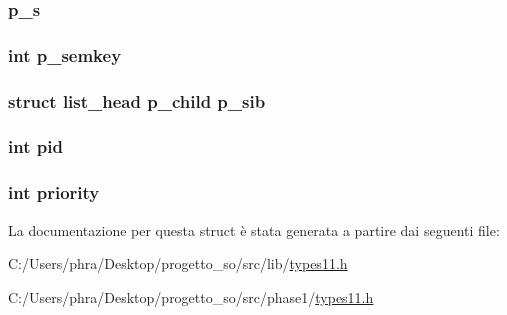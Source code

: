 \hypertarget{structpcb__t_ae1524fbfc37b7766b551477e48b3bf4d}{
\subsubsection[{p\-\_\-s}]{ p\-\_\-s}}\label{structpcb__t_ae1524fbfc37b7766b551477e48b3bf4d}
\hypertarget{structpcb__t_a831f803a73e91f4b1530e60bc24e92b4}{
\subsubsection[{p\-\_\-semkey}]{\setlength{\rightskip}{0pt plus 5cm}int p\-\_\-semkey}}\label{structpcb__t_a831f803a73e91f4b1530e60bc24e92b4}
\hypertarget{structpcb__t_ae571e01892f17d1ccf6332d96e6c5373}{
\subsubsection[{p\-\_\-sib}]{\setlength{\rightskip}{0pt plus 5cm}struct {\bf list\-\_\-head} p\-\_\-child p\-\_\-sib}}\label{structpcb__t_ae571e01892f17d1ccf6332d96e6c5373}
\hypertarget{structpcb__t_af500917c052066b40cf47f96b43c607b}{
\subsubsection[{pid}]{\setlength{\rightskip}{0pt plus 5cm}int pid}}\label{structpcb__t_af500917c052066b40cf47f96b43c607b}
\hypertarget{structpcb__t_acec9ce2df15222151ad66fcb1d74eb9f}{
\subsubsection[{priority}]{\setlength{\rightskip}{0pt plus 5cm}int priority}}\label{structpcb__t_acec9ce2df15222151ad66fcb1d74eb9f}


La documentazione per questa struct è stata generata a partire dai seguenti file\-:\begin{DoxyCompactItemize}
\item 
C\-:/\-Users/phra/\-Desktop/progetto\-\_\-so/src/lib/\hyperlink{lib_2types11_8h}{types11.\-h}\item 
C\-:/\-Users/phra/\-Desktop/progetto\-\_\-so/src/phase1/\hyperlink{phase1_2types11_8h}{types11.\-h}\end{DoxyCompactItemize}
